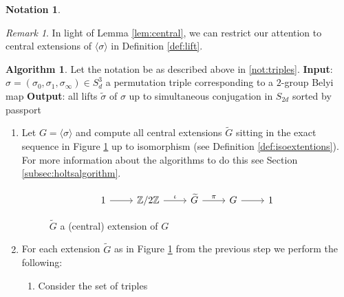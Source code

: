 \documentclass{dcthesis}
\newcommand{\ZZ}{\mathbb Z}
\newcommand{\wt}[1]{\widetilde{#1}}
\theoremstyle{definition}
\newtheorem{alg}[prop]{Algorithm}
\newtheorem{notation}[prop]{Notation}
\theoremstyle{remark}
\newtheorem{remark}[prop]{Remark}
\numberwithin{equation}{section}
\numberwithin{figure}{section}
\begin{document}
{{\begin{notation}
\begin{remark}
        \label{rmk:central}
        In light of Lemma \ref{lem:central},
        we can restrict our attention to central extensions of
        $\langle\sigma\rangle$
        in Definition \ref{def:lift}.
      \end{remark}
    \end{notation}
    \begin{alg}\label{alg:triples}
      Let the notation be as described above in \ref{not:triples}.
      \newline
      \textbf{Input}: $\sigma=(\sigma_0,\sigma_1,\sigma_\infty)\in S_d^3$ a permutation triple
      corresponding to a $2$-group Belyi map
      \newline
      \textbf{Output}: all lifts $\wt{\sigma}$
      of $\sigma$ up to simultaneous conjugation in $S_{2d}$
      sorted by passport
      \begin{enumerate}
        \item
          Let $G = \langle\sigma\rangle$
          and compute all central extensions $\wt{G}$
          sitting in the exact sequence in Figure \ref{fig:centralext}
          up to isomorphism (see Definition \ref{def:isoextentions}).
          For more information about the algorithms to do this
          see Section \ref{subsec:holtsalgorithm}.
          \begin{figure}[ht]
            \[
              \begin{tikzcd}[ampersand replacement=\&, row sep = small]
                1\arrow{r}\&\ZZ/2\ZZ\arrow{r}{\iota}\&\wt{G}\arrow{r}{\pi}\&G\arrow{r}\&1
              \end{tikzcd}
            \]
            \caption{$\wt{G}$ a (central) extension of $G$}
            \label{fig:centralext}
          \end{figure}
        \item
          For each extension $\wt{G}$ as in Figure \ref{fig:centralext}
          from the previous step
          we perform the following:
          \begin{enumerate}
            \item
              Consider the set of triples
              \begin{equation}
                \label{eqn:lifts}

\end{equation}
\end{enumerate}
\end{enumerate}
\end{alg}}}
\end{document}

